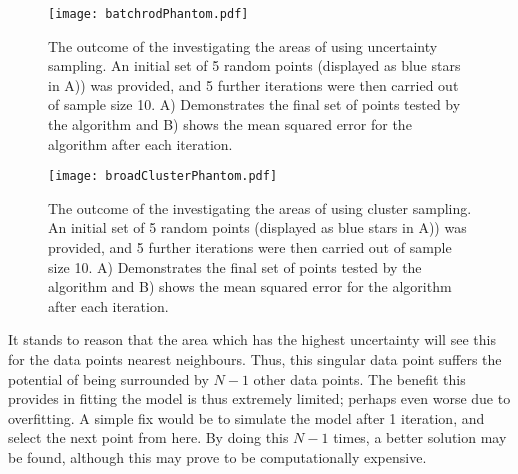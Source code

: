 \begin{figure}[H]
    \begin{center}
        \texttt{[image: batchrodPhantom.pdf]}
        \caption[Batch Uncertainty Sampling]{The outcome of the investigating the areas of using uncertainty sampling. An initial set of 5 random points (displayed as blue stars in A)) was provided, and 5 further iterations were then carried out of sample size 10. A) Demonstrates the final set of points tested by the algorithm and B) shows the mean squared error for the algorithm after each iteration.}
        \label{fig:broadrod}
    \end{center}
\end{figure}


\begin{figure}[H]
    \begin{center}
        \texttt{[image: broadClusterPhantom.pdf]}
        \caption[Batch Cluster Sampling]{The outcome of the investigating the areas of using cluster sampling. An initial set of 5 random points (displayed as blue stars in A)) was provided, and 5 further iterations were then carried out of sample size 10. A) Demonstrates the final set of points tested by the algorithm and B) shows the mean squared error for the algorithm after each iteration.}
        \label{fig:batchCluster}
    \end{center}
\end{figure}


It stands to reason that the area which has the highest uncertainty will see this for the data points nearest neighbours. Thus, this singular data point suffers the potential of being surrounded by $N-1$ other data points. The benefit this provides in fitting the model is thus extremely limited; perhaps even worse due to overfitting. A simple fix would be to simulate the model after 1 iteration, and select the next point from here. By doing this $N-1$ times, a better solution may be found, although this may prove to be computationally expensive.


